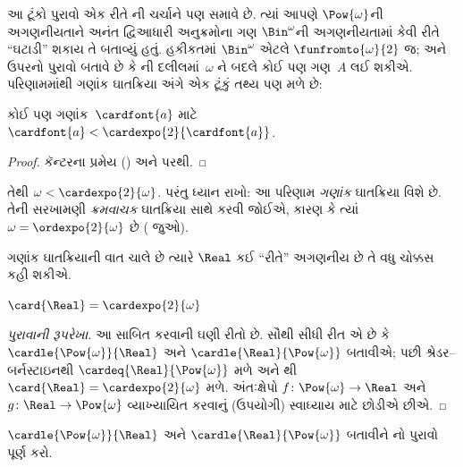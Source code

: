 આ ટૂંકો પુરાવો એક રીતે
ની ચર્ચાને પણ સમાવે છે.
ત્યાં આપણે $\Pow{\omega}$ની અગણનીયતાને અનંત દ્વિઆધારી
અનુક્રમોના ગણ $\Bin^\omega$ની અગણનીયતામાં કેવી રીતે
``ઘટાડી'' શકાય તે બતાવ્યું હતું. હકીકતમાં
$\Bin^{\omega}$ એટલે $\funfromto{\omega}{2}$ જ;
અને ઉપરનો પુરાવો બતાવે છે કે
ની દલીલમાં~$\omega$
ને બદલે કોઈ પણ ગણ~$A$ લઈ શકીએ. પરિણામમાંથી
ગણાંક ઘાતક્રિયા અંગે એક ટૂંકું તથ્ય પણ મળે છે:

\begin{cor}
કોઈ પણ ગણાંક~$\cardfont{a}$ માટે
$\cardfont{a} < \cardexpo{2}{\cardfont{a}}$.
\end{cor}

\begin{proof}
કૅન્ટરના પ્રમેય
() અને
 પરથી.
\end{proof}
\noindent
તેથી $\omega < \cardexpo{2}{\omega}$.
પરંતુ ધ્યાન રાખો: આ પરિણામ \emph{ગણાંક}
ઘાતક્રિયા વિશે છે. તેની સરખામણી \emph{ક્રમવાચક}
ઘાતક્રિયા સાથે કરવી જોઈએ, કારણ કે ત્યાં
$\omega = \ordexpo{2}{\omega}$ છે
( જુઓ).

ગણાંક ઘાતક્રિયાની વાત ચાલે છે ત્યારે
$\Real$ કઈ ``રીતે'' અગણનીય છે તે
વધુ ચોક્કસ કહી શકીએ.

\begin{thm}
$\card{\Real} = \cardexpo{2}{\omega}$
\end{thm}

\begin{proof}[પુરાવાની રૂપરેખા]
આ સાબિત કરવાની ઘણી રીતો છે. સૌથી સીધી રીત એ
છે કે $\cardle{\Pow{\omega}}{\Real}$ અને
$\cardle{\Real}{\Pow{\omega}}$ બતાવીએ; પછી
શ્રેડર--બર્નસ્ટાઇનથી $\cardeq{\Real}{\Pow{\omega}}$
મળે અને 
થી $\card{\Real} = \cardexpo{2}{\omega}$ મળે.
અંતઃક્ષેપો $f \colon \Pow{\omega} \to \Real$
અને $g \colon \Real \to \Pow{\omega}$ વ્યાખ્યાયિત
કરવાનું (ઉપયોગી) સ્વાધ્યાય માટે છોડીએ છીએ.
\end{proof}

\begin{prob}
$\cardle{\Pow{\omega}}{\Real}$ અને
$\cardle{\Real}{\Pow{\omega}}$ બતાવીને
નો
પુરાવો પૂર્ણ કરો.
\end{prob}
\endgroup

\begingroup
\makeatletter{}\makeatother


